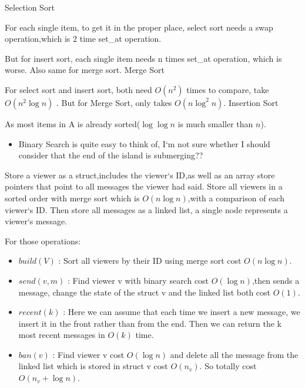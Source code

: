 \documentclass[12pt,twoside]{article}
\begin{document}
\begin{problems}
\begin{problemparts}
\problempart %
Selection Sort

For each single item, to get it in the proper place,
select sort needs a swap operation,which is 2 time
set\_at operation.

But for insert sort, each single item needs n times 
set\_at operation, which is worse. Also same for 
merge sort.
\problempart %
Merge Sort

For select sort and insert sort, both need $O(n^2)$ times to compare,
take $O(n^2\log n)$ . But for Merge Sort, only takes $O(n\log^2 n)$.
\problempart %
Insertion Sort

As most items in A is already sorted($\log\log n$ is much smaller than $n$).
\end{problemparts}

\problem  %
\begin{itemize}
  \item Binary Search is quite easy to think of, I`m not sure whether I should consider
that the end of the island is submerging??
\end{itemize}

\problem  %

\hspace{2em} Store a viewer as a struct,includes the viewer`s ID,as well as an array store pointers
that point to all messages the viewer had said.
Store all viewers in a sorted order with merge sort which is $O(n\log n)$,with a 
comparison of each viewer`s ID.
Then store all messages as a linked list, a single node represents a viewer`s message.

For those operations:
\begin{itemize}
  \item $build(V)$ : Sort all viewers by their ID using merge sort cost $O(n\log n)$.
  \item $send(v,m)$ : Find viewer v with binary search cost $O(\log n)$,then sends a
  message, change the state of the struct v and the linked list both cost $O(1)$.
  \item $recent(k)$ : Here we can assume that each time we insert a new message, 
  we insert it in the front rather than from the end. Then we can return the k most recent
  messages in $O(k)$ time.
  \item $ban(v)$ : Find viewer v cost $O(\log n)$ and delete all the message from the linked
  list which is stored in struct v cost $O(n_v)$. So totally cost $O(n_v+\log n)$.
\end{itemize}
\newpage
\problem  %


\end{problems}
\end{document}
